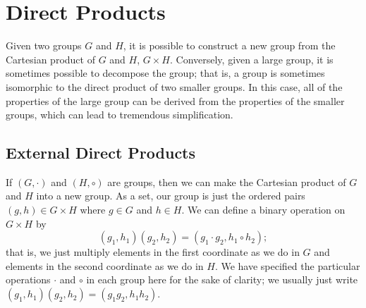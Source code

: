  

\section{Direct Products}\label{isomorph_section_2}

Given two groups $G$ and $H$, it is possible to construct a new group from the Cartesian product of $G$ and $H$, $G \times H$.  Conversely, given a large group, it is sometimes possible to decompose the group; that is, a group is sometimes isomorphic to the direct product of two smaller groups. In this case, all of the properties of the large group can be derived from the properties of the smaller groups, which can lead to tremendous simplification.
 
 
\subsection{External Direct Products}

If $(G,\cdot)$ and $(H, \circ)$ are groups, then we can make the Cartesian product of $G$ and $H$ into a new group.  As a set, our group is just the ordered pairs $(g, h) \in G \times H$ where $g \in G$ and $h \in H$. We can define a binary operation on $G \times H$ by 
\[
(g_1, h_1)(g_2, h_2) = (g_1 \cdot g_2, h_1 \circ h_2);
\]
that is, we just multiply elements in the first coordinate as we do in $G$ and elements in the second coordinate as we do in $H$.  We have specified the particular operations $\cdot$ and $\circ$ in each group here for the sake of clarity; we usually just write $(g_1, h_1)(g_2, h_2) = (g_1  g_2, h_1 h_2)$.  

